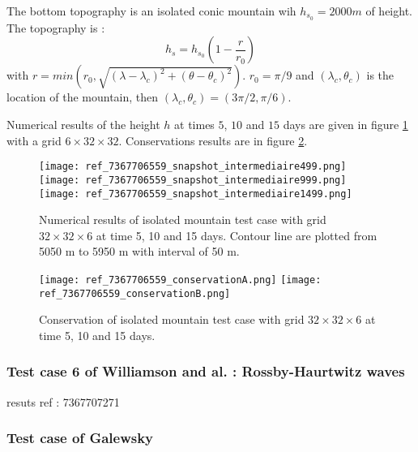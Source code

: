 The bottom topography is an isolated conic mountain wih $h_{s_0}=2000m$ of height. The topography is :
\begin{equation}
h_s = h_{s_0} \left( 1 - \dfrac{r}{r_0} \right)
\end{equation}
with $r=min \left( r_0, \sqrt{\left( \lambda - \lambda_c \right)^2 + \left( \theta - \theta_c \right)^2} \right)$. $r_0=\pi/9$ and $(\lambda_c, \theta_c)$ is the location of the mountain, then $(\lambda_c, \theta_c) = (3 \pi /2, \pi /6)$.

Numerical results of the height $h$ at times $5$, $10$ and $15$ days are given in figure \ref{fig:W5 snapshot} with a grid $6 \times 32 \times 32$. Conservations results are in figure \ref{fig:W5 conservation}.

\begin{figure}[ht!]
\texttt{[image: ref\_7367706559\_snapshot\_intermediaire499.png]}\\
\texttt{[image: ref\_7367706559\_snapshot\_intermediaire999.png]}\\
\texttt{[image: ref\_7367706559\_snapshot\_intermediaire1499.png]}
\caption{Numerical results of isolated mountain test case with grid  $32 \times 32 \times 6$ at time 5, 10 and 15 days. Contour line are plotted from 5050 m to 5950 m with interval of 50 m.}
\label{fig:W5 snapshot}
\end{figure}

\begin{figure}[ht!]
\texttt{[image: ref\_7367706559\_conservationA.png]}
\texttt{[image: ref\_7367706559\_conservationB.png]}
\caption{Conservation of isolated mountain test case with grid  $32 \times 32 \times 6$ at time 5, 10 and 15 days.}
\label{fig:W5 conservation}
\end{figure}

\subsubsection{Test case 6 of Williamson and al. : Rossby-Haurtwitz waves}

resuts ref : 7367707271

\subsubsection{Test case of Galewsky}


